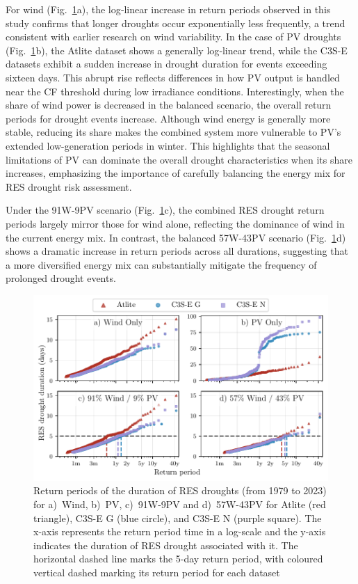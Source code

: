 \documentclass[preprint, 12pt]{elsarticle}
\begin{document}
For wind (Fig.~\ref{fig:return_periods}a), the log‐linear increase in return periods observed in this study confirms that longer droughts occur exponentially less frequently, a trend consistent with earlier research on wind variability. In the case of PV droughts (Fig.~\ref{fig:return_periods}b), the Atlite dataset shows a generally log‐linear trend, while the C3S-E datasets exhibit a sudden increase in drought duration for events exceeding sixteen days. This abrupt rise reflects differences in how PV output is handled near the CF threshold during low irradiance conditions. Interestingly, when the share of wind power is decreased in the balanced scenario, the overall return periods for drought events increase. Although wind energy is generally more stable, reducing its share makes the combined system more vulnerable to PV’s extended low-generation periods in winter. This highlights that the seasonal limitations of PV can dominate the overall drought characteristics when its share increases, emphasizing the importance of carefully balancing the energy mix for RES drought risk assessment.

Under the 91W-9PV scenario (Fig.~\ref{fig:return_periods}c), the combined RES drought return periods largely mirror those for wind alone, reflecting the dominance of wind in the current energy mix. In contrast, the balanced 57W-43PV scenario (Fig.~\ref{fig:return_periods}d) shows a dramatic increase in return periods across all durations, suggesting that a more diversified energy mix can substantially mitigate the frequency of prolonged drought events. 

\begin{figure}[!ht]
	\centering
	\includegraphics[width=\textwidth]{droughts_return_periods.pdf}
	\caption{Return periods of the duration of RES droughts  (from 1979 to 2023) for a)~Wind, b)~PV, c)~91W-9PV and d)~57W-43PV for Atlite (red triangle), C3S-E G (blue circle), and C3S-E N (purple square). The x-axis represents the return period time in a log-scale and the y-axis indicates the duration of RES drought associated with it. The horizontal dashed line marks the 5-day return period, with coloured vertical dashed marking its return period for each dataset}
	\label{fig:return_periods}
\end{figure}
\end{document}
